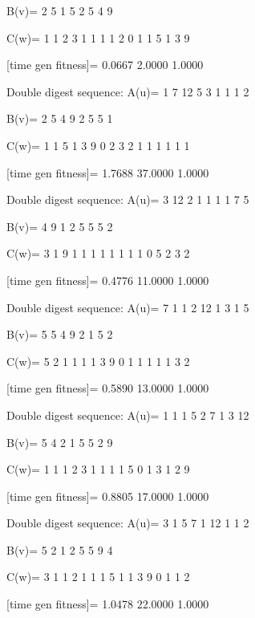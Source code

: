 B(v)=
     2     5     1     5     2     5     4     9

C(w)=
     1     1     2     3     1     1     1     1     2     0     1     1     5     1     3     9

[time gen fitness]=
    0.0667    2.0000    1.0000

Double digest sequence:
A(u)=
     1     7    12     5     3     1     1     1     2

B(v)=
     2     5     4     9     2     5     5     1

C(w)=
     1     1     5     1     3     9     0     2     3     2     1     1     1     1     1     1

[time gen fitness]=
    1.7688   37.0000    1.0000

Double digest sequence:
A(u)=
     3    12     2     1     1     1     1     7     5

B(v)=
     4     9     1     2     5     5     5     2

C(w)=
     3     1     9     1     1     1     1     1     1     1     1     0     5     2     3     2

[time gen fitness]=
    0.4776   11.0000    1.0000

Double digest sequence:
A(u)=
     7     1     1     2    12     1     3     1     5

B(v)=
     5     5     4     9     2     1     5     2

C(w)=
     5     2     1     1     1     1     3     9     0     1     1     1     1     1     3     2

[time gen fitness]=
    0.5890   13.0000    1.0000

Double digest sequence:
A(u)=
     1     1     1     5     2     7     1     3    12

B(v)=
     5     4     2     1     5     5     2     9

C(w)=
     1     1     1     2     3     1     1     1     1     5     0     1     3     1     2     9

[time gen fitness]=
    0.8805   17.0000    1.0000

Double digest sequence:
A(u)=
     3     1     5     7     1    12     1     1     2

B(v)=
     5     2     1     2     5     5     9     4

C(w)=
     3     1     1     2     1     1     1     5     1     1     3     9     0     1     1     2

[time gen fitness]=
    1.0478   22.0000    1.0000

